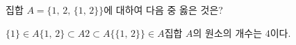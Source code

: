 집합 $A=\{1,\,2,\,\{1,\,2\}\}$에 대하여 다음 중 옳은 것은?
\begin{choicesii}{$\{1\}\in A$}{$\{1,\,2\}\subset A$}{$2\subset A$}{$\{\{1,\,2\}\}\in A$}{집합 $A$의 원소의 개수는 $4$이다.}\end{choicesii}
